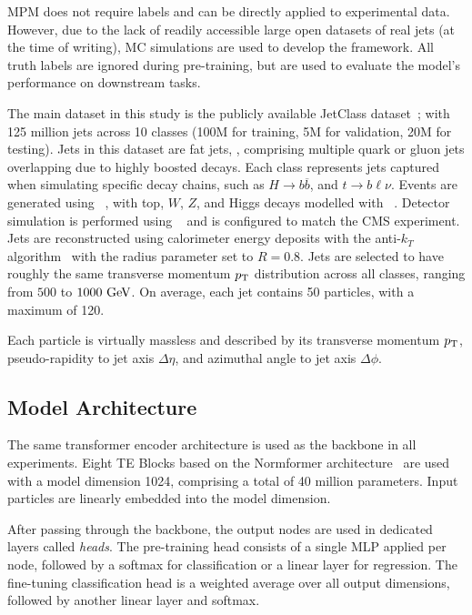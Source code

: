 MPM does not require labels and can be directly applied to experimental data.
However, due to the lack of readily accessible large open datasets of real jets (at the time of writing), MC simulations are used to develop the framework.
All truth labels are ignored during pre-training, but are used to evaluate the model's performance on downstream tasks.

The main dataset in this study is the publicly available JetClass dataset~\cite{JetClass}; with 125 million jets across 10 classes (100M for training, 5M for validation, 20M for testing).
Jets in this dataset are fat jets, , comprising multiple quark or gluon jets overlapping due to highly boosted decays.
Each class represents jets captured when simulating specific decay chains, such as $H \rightarrow b\overline{b}$, and $t \rightarrow b \ell \nu$.
Events are generated using \pythia~\cite{Pythia8}, with top, $W$, $Z$, and Higgs decays modelled with \madgraph~\cite{MadGraph}.
Detector simulation is performed using \delphes~\cite{Delphes} and is configured to match the CMS experiment.
Jets are reconstructed using calorimeter energy deposits with the anti-$k_T$ algorithm~\cite{AntiKt} with the radius parameter set to $R=0.8$.
Jets are selected to have roughly the same transverse momentum $p_\mathrm{T}$ distribution across all classes, ranging from $500$ to $1000~\GeV$.
On average, each jet contains 50 particles, with a maximum of 120.

Each particle is virtually massless and described by its transverse momentum $p_\mathrm{T}$, pseudo-rapidity to jet axis $\Delta\eta$, and azimuthal angle to jet axis $\Delta\phi$.

\subsection{Model Architecture}

The same transformer encoder architecture is used as the backbone in all experiments.
Eight TE Blocks based on the Normformer architecture~\cite{Normformer} are used with a model dimension 1024, comprising a total of 40 million parameters.
Input particles are linearly embedded into the model dimension.

After passing through the backbone, the output nodes are used in dedicated layers called \textit{heads}.
The pre-training head consists of a single MLP applied per node, followed by a softmax for classification or a linear layer for regression.
The fine-tuning classification head is a weighted average over all output dimensions, followed by another linear layer and softmax.

